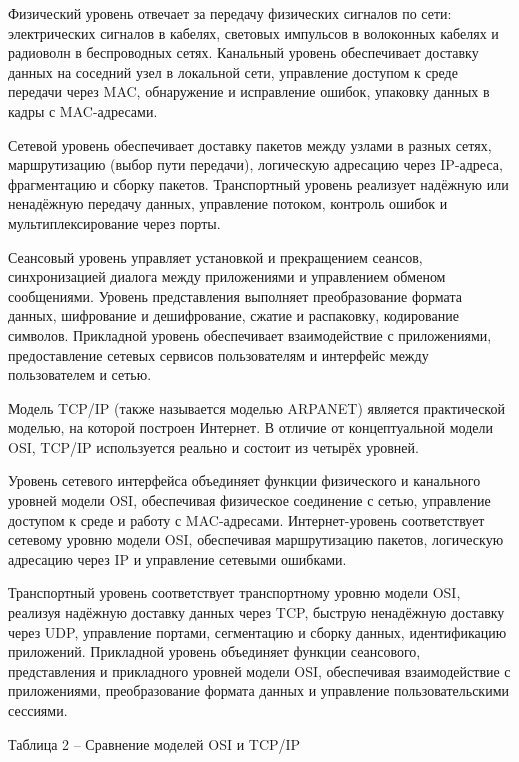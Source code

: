 \documentclass{SibFU-docs}
\begin{document}
Физический уровень отвечает за передачу физических сигналов по сети: электрических сигналов в кабелях, световых импульсов в волоконных кабелях и радиоволн в беспроводных сетях. Канальный уровень обеспечивает доставку данных на соседний узел в локальной сети, управление доступом к среде передачи через MAC, обнаружение и исправление ошибок, упаковку данных в кадры с MAC-адресами.

Сетевой уровень обеспечивает доставку пакетов между узлами в разных сетях, маршрутизацию (выбор пути передачи), логическую адресацию через IP-адреса, фрагментацию и сборку пакетов. Транспортный уровень реализует надёжную или ненадёжную передачу данных, управление потоком, контроль ошибок и мультиплексирование через порты.

Сеансовый уровень управляет установкой и прекращением сеансов, синхронизацией диалога между приложениями и управлением обменом сообщениями. Уровень представления выполняет преобразование формата данных, шифрование и дешифрование, сжатие и распаковку, кодирование символов. Прикладной уровень обеспечивает взаимодействие с приложениями, предоставление сетевых сервисов пользователям и интерфейс между пользователем и сетью.


Модель TCP/IP (также называется моделью ARPANET) является практической моделью, на которой построен Интернет. В отличие от концептуальной модели OSI, TCP/IP используется реально и состоит из четырёх уровней.

Уровень сетевого интерфейса объединяет функции физического и канального уровней модели OSI, обеспечивая физическое соединение с сетью, управление доступом к среде и работу с MAC-адресами. Интернет-уровень соответствует сетевому уровню модели OSI, обеспечивая маршрутизацию пакетов, логическую адресацию через IP и управление сетевыми ошибками.

Транспортный уровень соответствует транспортному уровню модели OSI, реализуя надёжную доставку данных через TCP, быструю ненадёжную доставку через UDP, управление портами, сегментацию и сборку данных, идентификацию приложений. Прикладной уровень объединяет функции сеансового, представления и прикладного уровней модели OSI, обеспечивая взаимодействие с приложениями, преобразование формата данных и управление пользовательскими сессиями.

\vspace{1.5em}

\noindent Таблица 2 – Сравнение моделей OSI и TCP/IP
\end{document}
